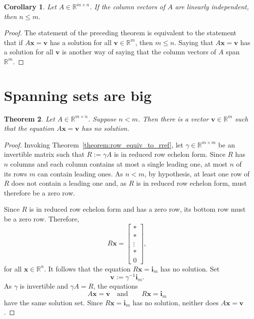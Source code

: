 \documentclass[12pt]{amsart}
\newcommand{\RR}{\mathbb{R}}
\newtheorem{theorem}{Theorem}[section]
\newtheorem{corollary}[theorem]{Corollary}
\theoremstyle{definition}
\newcommand{\bi}{\mathbf{i}}
\newcommand{\bv}{\mathbf{v}}
\newcommand{\bx}{\mathbf{x}}
\newcommand{\Rmn}{\RR^{m\times n}}
\begin{document}
\begin{corollary}\label{corollary:lin_ind_sets_are_small}
	Let $A\in\Rmn$.
	If the column vectors of $A$ are linearly independent, then $n \leq m$.
\end{corollary}

\begin{proof}
	The statement of the preceding theorem is equivalent to the statement that if $A\bx=\bv$ has a solution for all
	$\bv\in\RR^m$, then $m\leq n$.
	Saying that $A\bx=\bv$ has a solution for all $\bv$ is	another way of saying that the column vectors of $A$ span 
	$\RR^m$.
\end{proof}


\section{Spanning sets are big}

\begin{theorem}
	Let $A\in\Rmn$.
	Suppose $n < m$.
	Then there is a vector $\bv\in\RR^m$ such that the equation $A\bx=\bv$ has no solution.
\end{theorem}

\begin{proof}
	Invoking Theorem~\ref{theorem:row_equiv_to_rref}, let $\gamma\in\RR^{m\times m}$ be an invertible matrix such that
	$R := \gamma A$ is in reduced row echelon form.
	Since $R$ has $n$ columns and each column contains at most a single leading one,
	at most $n$ of its rows $m$ can contain leading ones.
	As $n<m$, by hypothesis, at least one row of $R$ does not contain a leading one and, as $R$ is in reduced
	row echelon form, must therefore be a zero row.

	Since $R$ is in reduced row echelon form and has a zero row, its bottom row must be a zero row. Therefore,
	\[
		R\bx=\begin{bmatrix}* \\ * \\\vdots\\ * \\0\end{bmatrix},
	\]
	for all $\bx\in \RR^n$.
	It follows that the equation $R\bx=\bi_m$ has no solution.
	Set
	\[
		\bv:=\gamma^{-1}\bi_m.
	\]
	As $\gamma$ is invertible and $\gamma A=R$, the equations
	\[
		A\bx=\bv
                \quad\text{and}\quad\quad 
		R\bx=\bi_m
	\]
	have the same solution set. Since $R\bx=\bi_m$ has no solution, neither does $A\bx=\bv$.
\end{proof}
\end{document}
